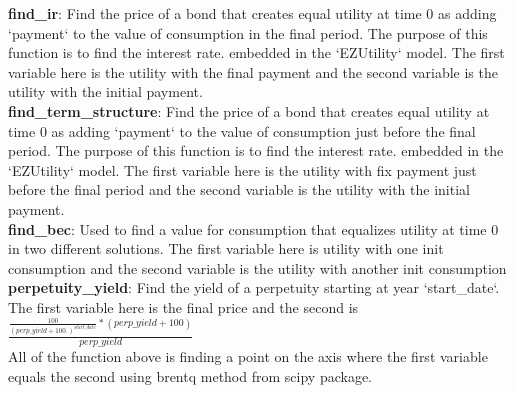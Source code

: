 \documentclass[12pt]{article}
\begin{document}
\textbf{find\_ir}: Find the price of a bond that creates equal utility at time 0 as adding `payment` to the value of
	consumption in the final period. The purpose of this function is to find the interest rate.
	embedded in the `EZUtility` model. The first variable here is the utility with the final payment and the second variable is the utility with the initial payment.\\
\textbf{find\_term\_structure}: Find the price of a bond that creates equal utility at time 0 as adding `payment` to the value of
	consumption just before the final period. The purpose of this function is to find the interest rate.
	embedded in the `EZUtility` model. The first variable here is the utility with fix payment just before the final period and the second variable is the utility with the initial payment. \\
\textbf{find\_bec}: Used to find a value for consumption that equalizes utility at time 0 in two different solutions. The first variable here is utility with one init consumption and the second variable is the
utility with another init consumption\\
\textbf{perpetuity\_yield}: Find the yield of a perpetuity starting at year `start\_date`. The first variable here is the final price and the second is $\frac{\frac{100}{(perp\_yield+100.)^{start\_date}} * (perp\_yield + 100)}{perp\_yield}$\\
All of the function above is finding a point on the axis where the first variable equals the second using brentq method from scipy package.
\end{document}
